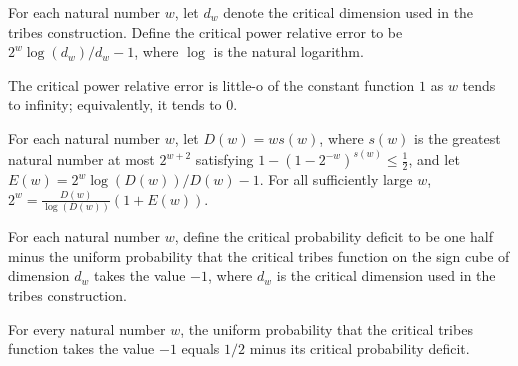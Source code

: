 \begin{definition}
\label{FABL.tribesCriticalPowerRelativeError}
\leanok
{}
For each natural number $w$, let $d_w$ denote the critical dimension used in the tribes
construction. Define the critical power relative error to be $2^w\log(d_w)/d_w-1$, where
$\log$ is the natural logarithm.
\end{definition}

\begin{theorem}
\label{FABL.tribesCriticalPowerRelativeError_isLittleO_one}
\leanok
{}
The critical power relative error is little-o of the constant function $1$ as $w$ tends
to infinity; equivalently, it tends to $0$.
\end{theorem}

\begin{theorem}
\label{FABL.eventually_two_pow_eq_dimension_div_log_mul_one_add_error}
\leanok
{}
For each natural number $w$, let $D(w)=w s(w)$, where $s(w)$ is the greatest natural
number at most $2^{w+2}$ satisfying $1-(1-2^{-w})^{s(w)}\le \tfrac12$, and let
$E(w)=2^w\log(D(w))/D(w)-1$. For all sufficiently large $w$,
$2^w=\frac{D(w)}{\log(D(w))}(1+E(w))$.
\end{theorem}

\begin{definition}
\label{FABL.tribesCriticalProbabilityDeficit}
\leanok
{}
For each natural number $w$, define the critical probability deficit to be one half
minus the uniform probability that the critical tribes function on the sign cube of
dimension $d_w$ takes the value $-1$, where $d_w$ is the critical dimension used in the
tribes construction.
\end{definition}

\begin{theorem}
\label{FABL.tribesCritical_neg_one_probability_eq_half_sub_deficit}
\leanok
{}
For every natural number $w$, the uniform probability that the critical tribes function
takes the value $-1$ equals $1/2$ minus its critical probability deficit.
\end{theorem}


